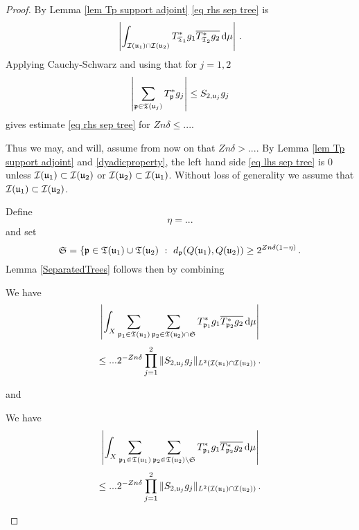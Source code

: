 \begin{proof}
    By Lemma \ref{lem Tp support adjoint} \eqref{eq rhs sep tree} is
    $$
        \left| \int_{\mathcal{I}(\mathfrak u_1) \cap \mathcal{I}(\mathfrak u_2)} T^*_{\mathfrak{T}_1}g_1 \overline{T^*_{\mathfrak{T}_2}g_2 }\,\mathrm{d}\mu \right|\,.
    $$
    Applying Cauchy-Schwarz and using that for $j=1,2$
    $$
            \left|\sum_{\mathfrak p \in \mathfrak T(\mathfrak u_j)} T_{\mathfrak p}^*g_j \right| \le S_{2,\mathfrak u_j} g_j
    $$
    gives estimate \eqref{eq rhs sep tree} for $Zn\delta \le ...$.

    Thus we may, and will, assume from now on that $Zn\delta > ...$. By Lemma \ref{lem Tp support adjoint} and \eqref{dyadicproperty}, the left hand side \eqref{eq lhs sep tree} is $0$ unless $\mathcal{I}(\mathfrak u_1) \subset \mathcal{I}(\mathfrak u_2)$ or $\mathcal{I}(\mathfrak u_2) \subset \mathcal{I}(\mathfrak u_1)$. Without loss of generality we assume that $\mathcal{I}(\mathfrak u_1) \subset \mathcal{I}(\mathfrak u_2)$.

    Define
    $$
        \eta = ...
    $$
    and set
    $$
        \mathfrak{S} = \{\mathfrak p \in \mathfrak T(\mathfrak u_1) \cup \mathfrak T(\mathfrak u_2) \ : \ d_{\mathfrak p}(Q(\mathfrak u_1), Q(\mathfrak u_2)) \ge 2^{Zn\delta(1 - \eta)}\,.
    $$
    Lemma \ref{SeparatedTrees} follows then by combining
    \begin{lemma}
        \label{lem big sep tree}
        We have
        \begin{equation}
            \label{eq lhs big sep tree}
            \left| \int_X \sum_{\mathfrak p_1 \in \mathfrak T(\mathfrak u_1)} \sum_{\mathfrak p_2 \in \mathfrak T(\mathfrak u_2) \cap \mathfrak{S}} T^*_{\mathfrak p_1}g_1 \overline{T^*_{\mathfrak p_2}g_2 }\,\mathrm{d}\mu \right|
        \end{equation}
        \begin{equation}
            \label{eq rhs big sep tree}
            \le ... 2^{-Zn\delta} \prod_{j =1}^2 \| S_{2, \mathfrak u_j} g_j\|_{L^2(\mathcal{I}(\mathfrak u_1) \cap \mathcal{I}(\mathfrak u_2))}\,.
        \end{equation}
    \end{lemma}
    and
    \begin{lemma}
        \label{lem small sep tree}
        We have
        \begin{equation}
            \label{eq lhs small sep tree}
            \left| \int_X \sum_{\mathfrak p_1 \in \mathfrak T(\mathfrak u_1)} \sum_{\mathfrak p_2 \in \mathfrak T(\mathfrak u_2) \setminus \mathfrak{S}} T^*_{\mathfrak p_1}g_1 \overline{T^*_{\mathfrak p_2}g_2 }\,\mathrm{d}\mu \right|
        \end{equation}
        \begin{equation}
            \label{eq rhs small sep tree}
            \le ... 2^{-Zn\delta} \prod_{j =1}^2 \| S_{2, \mathfrak u_j} g_j\|_{L^2(\mathcal{I}(\mathfrak u_1) \cap \mathcal{I}(\mathfrak u_2))}\,.
        \end{equation}
    \end{lemma}
\end{proof}

